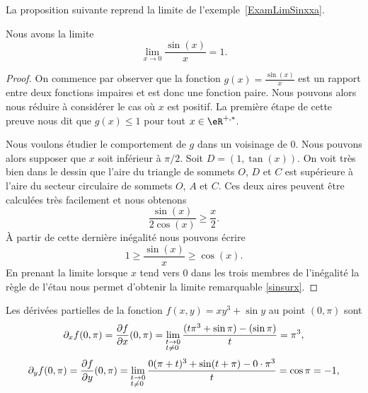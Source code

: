 La proposition suivante reprend la limite de l'exemple~\ref{ExamLimSinxxa}.
\begin{proposition}     \label{PROPooNBRBooEQBypy}
    Nous avons la limite
    \begin{equation}\label{sinsurx}
      \lim_{x\to 0} \frac{\sin(x)}{x} = 1.
    \end{equation}
\end{proposition}

\begin{proof}
    On commence par observer que la fonction $g(x)=\frac{\sin(x)}{x}$ est un rapport entre deux fonctions impaires et est donc une fonction paire. Nous pouvons alors nous réduire à considérer le cas où $x$ est positif. La première étape de cette preuve nous dit que $g(x)\leq 1$ pour tout $x\in\eR^{+,*}$.

    Nous voulons étudier le comportement de $g$ dans un voisinage de $0$. Nous pouvons alors supposer que $x$ soit inférieur à $\pi/2$. Soit $D = (1, \tan (x))$. On voit très bien dans le dessin que l'aire du triangle de sommets $O$, $D$ et $C$ est supérieure à l'aire du secteur circulaire de sommets $O$, $A$ et $C$. Ces deux aires peuvent \^etre calculées très facilement et nous obtenons
    \begin{equation*}
      \frac{\sin(x)}{2\cos(x)} \geq \frac{x}{2}.
    \end{equation*}
    À partir de cette dernière inégalité nous pouvons écrire
    \begin{equation*}
      1\geq \frac{\sin(x)}{x}\geq \cos(x).
    \end{equation*}
    En prenant la limite lorsque $x$ tend vers $0$ dans les trois membres de l'inégalité la règle de l'étau nous permet d'obtenir la limite remarquable  \eqref{sinsurx}.
\end{proof}

\begin{example}     \label{EXooETZYooYsKPDJ}
Les dérivées partielles de la fonction $f(x,y)=xy^3+\sin y$ au point $(0,\pi)$ sont
\[
\partial_xf(0,\pi)=\frac{ \partial f }{ \partial x }(0,\pi)=\lim_{\begin{subarray}{l}
    t\to 0\\ t\neq 0
  \end{subarray}} \frac{(t\pi^3+\sin \pi)-(\sin \pi)}{t}= \pi^3,
\]
\[
\partial_yf(0,\pi)=\frac{ \partial f }{ \partial y }(0,\pi)=\lim_{\begin{subarray}{l}
    t\to 0\\ t\neq 0
  \end{subarray}} \frac{0(\pi+t)^3+\sin (t+\pi)-0\cdot \pi^3}{t}= \cos \pi=-1,
\]
\end{example}

